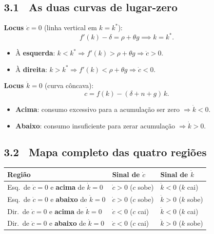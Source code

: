 \documentclass[12pt, a4paper]{article}
\newcommand{\kstar}{k^*}
\begin{document}
\subsection*{3.1 \ As duas curvas de lugar-zero}

\textbf{Locus $\dot{c}=0$} (linha vertical em $k=\kstar$):
\[
f'(k)-\delta = \rho + \theta g \implies k = \kstar.
\]
\begin{itemize}[leftmargin=1.5em, topsep=2pt, itemsep=1pt]
  \item À \textbf{esquerda}: $k < \kstar \Rightarrow f'(k) > \rho+\theta g \Rightarrow \dot{c}>0$.
  \item À \textbf{direita}: $k > \kstar \Rightarrow f'(k) < \rho+\theta g \Rightarrow \dot{c}<0$.
\end{itemize}

\textbf{Locus $\dot{k}=0$} (curva côncava):
\[
c = f(k) - (\delta+n+g)\,k.
\]
\begin{itemize}[leftmargin=1.5em, topsep=2pt, itemsep=1pt]
  \item \textbf{Acima}: consumo excessivo para a acumulação ser zero $\Rightarrow \dot{k}<0$.
  \item \textbf{Abaixo}: consumo insuficiente para zerar acumulação $\Rightarrow \dot{k}>0$.
\end{itemize}

\subsection*{3.2 \ Mapa completo das quatro regiões}

\begin{resultbox}[title={Diagrama de fases: quatro quadrantes}]
\begin{center}
\begin{tabular}{p{4.8cm}p{3.5cm}p{3.5cm}}
\toprule
Região & Sinal de $\dot{c}$ & Sinal de $\dot{k}$ \\
\midrule
Esq.\ de $\dot{c}=0$ e \textbf{acima} de $\dot{k}=0$
  & $\dot{c}>0$ ($c$ sobe) & $\dot{k}<0$ ($k$ cai) \\[4pt]
Esq.\ de $\dot{c}=0$ e \textbf{abaixo} de $\dot{k}=0$
  & $\dot{c}>0$ ($c$ sobe) & $\dot{k}>0$ ($k$ sobe) \\[4pt]
Dir.\ de $\dot{c}=0$ e \textbf{acima} de $\dot{k}=0$
  & $\dot{c}<0$ ($c$ cai) & $\dot{k}<0$ ($k$ cai) \\[4pt]
Dir.\ de $\dot{c}=0$ e \textbf{abaixo} de $\dot{k}=0$
  & $\dot{c}<0$ ($c$ cai) & $\dot{k}>0$ ($k$ sobe) \\
\bottomrule
\end{tabular}
\end{center}
\end{resultbox}
\end{document}
